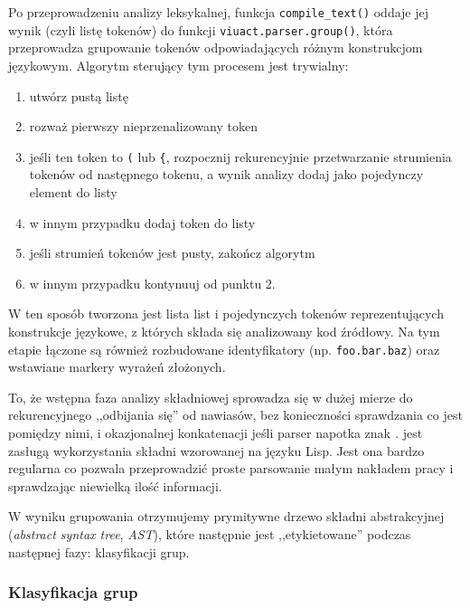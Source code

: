 Po przeprowadzeniu analizy leksykalnej, funkcja \texttt{compile\_text()} oddaje
jej wynik (czyli listę tokenów) do funkcji \texttt{viuact.parser.group()}, która
przeprowadza grupowanie tokenów odpowiadających różnym konstrukcjom językowym.
Algorytm sterujący tym procesem jest trywialny:

\begin{enumerate}
    \item utwórz pustą listę
    \item rozważ pierwszy nieprzenalizowany token
    \item jeśli ten token to \texttt{(} lub \texttt{\{}, rozpocznij
        rekurencyjnie przetwarzanie strumienia tokenów od następnego tokenu, a
        wynik analizy dodaj jako pojedynczy element do listy
    \item w innym przypadku dodaj token do listy
    \item jeśli strumień tokenów jest pusty, zakończ algorytm
    \item w innym przypadku kontynuuj od punktu 2.
\end{enumerate}

W ten sposób tworzona jest lista list i pojedynczych tokenów reprezentujących
konstrukcje językowe, z których składa się analizowany kod źródłowy. Na tym
etapie łączone są również rozbudowane identyfikatory (np. \texttt{foo.bar.baz})
oraz wstawiane markery wyrażeń złożonych.

To, że wstępna faza analizy składniowej sprowadza się w dużej mierze do
rekurencyjnego ,,odbijania się'' od nawiasów, bez konieczności sprawdzania co
jest pomiędzy nimi, i okazjonalnej konkatenacji jeśli parser napotka znak
\emph{.} jest zasługą wykorzystania składni wzorowanej na języku Lisp. Jest ona
bardzo regularna co pozwala przeprowadzić proste parsowanie małym nakładem pracy
i sprawdzając niewielką ilość informacji.

\vspace{1em}

W wyniku grupowania otrzymujemy prymitywne drzewo składni abstrakcyjnej
(\emph{abstract syntax tree}, \emph{AST}), które następnie jest ,,etykietowane''
podczas następnej fazy: klasyfikacji grup.

\subsubsection{Klasyfikacja grup}

